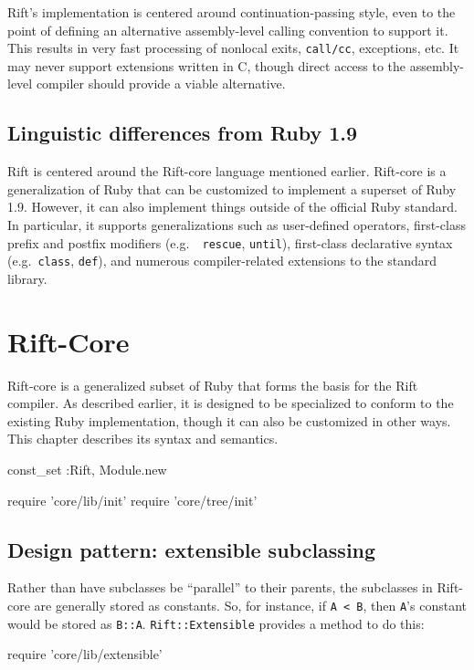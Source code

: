 \documentclass{report}
\begin{document}
    Rift's implementation is centered around continuation-passing style, even to the point of defining an alternative assembly-level calling convention to support it. This results in very fast
    processing of nonlocal exits, {\tt call/cc}, exceptions, etc. It may never support extensions written in C, though direct access to the assembly-level compiler should provide a viable
    alternative.

\section{Linguistic differences from Ruby 1.9}
    Rift is centered around the Rift-core language mentioned earlier. Rift-core is a generalization of Ruby that can be customized to implement a superset of Ruby 1.9. However, it can also
    implement things outside of the official Ruby standard. In particular, it supports generalizations such as user-defined operators, first-class prefix and postfix modifiers (e.g.~{\tt
    rescue}, {\tt until}), first-class declarative syntax (e.g.~{\tt class}, {\tt def}), and numerous compiler-related extensions to the standard library.

\chapter{Rift-Core}
  Rift-core is a generalized subset of Ruby that forms the basis for the Rift compiler. As described earlier, it is designed to be specialized to conform to the existing Ruby implementation,
  though it can also be customized in other ways. This chapter describes its syntax and semantics.

\begin{rubycode}
const_set :Rift, Module.new

require 'core/lib/init'
require 'core/tree/init' \end{rubycode}

\section{Design pattern: extensible subclassing}
    Rather than have subclasses be ``parallel'' to their parents, the subclasses in Rift-core are generally stored as constants. So, for instance, if {\tt A < B}, then {\tt A}'s constant would
    be stored as {\tt B::A}. {\tt Rift::Extensible} provides a method to do this:

\begin{rubycode}
require 'core/lib/extensible' \end{rubycode}
\end{document}
